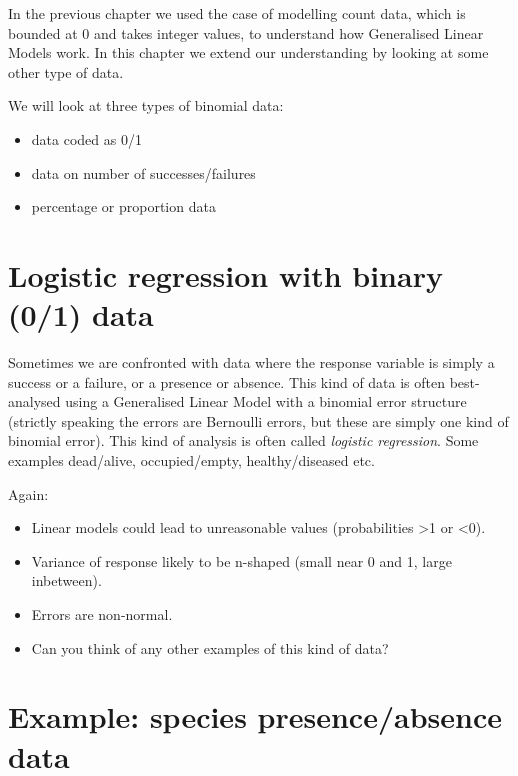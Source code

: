 \documentclass[
  a4paperpaper,
]{book}
\providecommand{\tightlist}{%
  \setlength{\itemsep}{0pt}\setlength{\parskip}{0pt}}
\begin{document}
In the previous chapter we used the case of modelling count data, which is bounded at 0 and takes integer values, to understand how Generalised Linear Models work. In this chapter we extend our understanding by looking at some other type of data.

We will look at three types of binomial data:

\begin{itemize}
\tightlist
\item
  data coded as 0/1
\item
  data on number of successes/failures
\item
  percentage or proportion data
\end{itemize}

\hypertarget{logistic-regression-with-binary-01-data}{%
\section{Logistic regression with binary (0/1) data}\label{logistic-regression-with-binary-01-data}}

Sometimes we are confronted with data where the response variable is simply a success or a failure, or a presence or absence. This kind of data is often best-analysed using a Generalised Linear Model with a binomial error structure (strictly speaking the errors are Bernoulli errors, but these are simply one kind of binomial error). This kind of analysis is often called \emph{logistic regression}. Some examples dead/alive, occupied/empty, healthy/diseased etc.

Again:

\begin{itemize}
\item
  Linear models could lead to unreasonable values (probabilities \textgreater1 or \textless0).
\item
  Variance of response likely to be n-shaped (small near 0 and 1, large inbetween).
\item
  Errors are non-normal.
\item
  Can you think of any other examples of this kind of data?
\end{itemize}

\hypertarget{example-species-presenceabsence-data}{%
\section{Example: species presence/absence data}\label{example-species-presenceabsence-data}}
\end{document}
